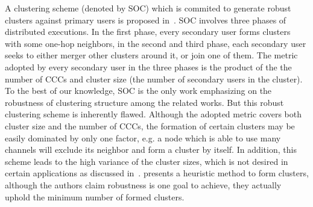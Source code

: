 \documentclass[10pt,journal,compsoc]{IEEEtran}
\theoremstyle{mytheoremstyle}
\theoremstyle{mytheoremstyle}
\theoremstyle{mytheoremstyle}
\begin{document}
A clustering scheme (denoted by SOC) which is commited to generate robust clusters against primary users is proposed in~\cite{LIU_TMC11_2}.
SOC involves three phases of distributed executions.
In the first phase, every secondary user forms clusters with some one-hop neighbors, in the second and third phase, each secondary user seeks to either merger other clusters around it, or join one of them.
The metric adopted by every secondary user in the three phases is the product of the the number of CCCs and cluster size (the number of secondary users in the cluster).
To the best of our knowledge, SOC is the only work emphasizing on the robustness of clustering structure among the related works. 
But this robust clustering scheme is inherently flawed.
Although the adopted metric covers both cluster size and the number of CCCs, the formation of certain clusters may be easily dominated by only one factor, e.g. a node which is able to use many channels will exclude its neighbor and form a cluster by itself.
In addition, this scheme leads to the high variance of the cluster sizes, which is not desired in certain applications as discussed in~\cite{clustering_globecom11, cluster_EW10}.
\cite{mansoor_15_cluster_robust} presents a heuristic method to form clusters, although the authors claim robustness is one goal to achieve, they actually uphold the minimum number of formed clusters.
\end{document}
